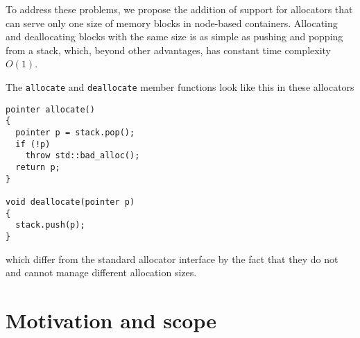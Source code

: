 \documentclass[11pt]{article}
\begin{document}
To address these problems, we propose the addition of support for
allocators that can serve only one size of memory blocks in
node-based containers.  Allocating and deallocating blocks with
the same size is as simple as pushing and popping from a stack,
which, beyond other advantages, has constant time complexity
$O(1)$.

The \texttt{allocate} and \texttt{deallocate} member functions
look like this in these allocators

\begin{lstlisting}
pointer allocate()
{
  pointer p = stack.pop(); 
  if (!p)
    throw std::bad_alloc();
  return p; 
}

void deallocate(pointer p)
{
  stack.push(p);
}
\end{lstlisting}
which differ from the standard allocator interface by the fact
that they do not and cannot manage different allocation sizes.
\section{Motivation and scope}
\end{document}
